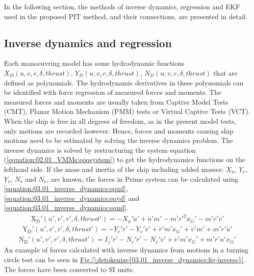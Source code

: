 \documentclass[review]{elsarticle}
\begin{document}
\sphinxAtStartPar
In the following section, the methods of inverse dynamics, regression and EKF used in the proposed PIT
method, and their connections, are presented in detail.


\subsection{Inverse dynamics and regression}
\label{\detokenize{03.01_inverse_dynamics:inverse-dynamics-and-regression}}\label{\detokenize{03.01_inverse_dynamics::doc}}
\sphinxAtStartPar
Each manoeuvring model has some hydrodynamic functions \(X_D(u,v,r,\delta,thrust)\), \(Y_D(u,v,r,\delta,thrust)\), \(N_D(u,v,r,\delta,thrust)\) that are defined as polynomials. The hydrodynamic derivatives in these polynomials can be identified with force regression of measured forces and moments. The measured forces and moments are usually taken from Captive Model Tests (CMT), Planar Motion Mechanism (PMM) tests or Virtual Captive Tests (VCT). When the ship is free in all degrees of freedom, as in the present model tests, only
motions are recorded however. Hence, forces and moments causing ship motions need to be estimated by
solving the inverse dynamics problem.
The inverse dynamics is solved by restructuring the system equation (\autoref{equation:02.01_VMMs:eqqsystem}) to get the hydrodynamics functions on the left\sphinxhyphen{}hand side. If the mass and inertia of the ship including added masses: \(X_{\dot{u}}\), \(Y_{\dot{v}}\), \(Y_{\dot{r}}\), \(N_{\dot{v}}\) and \(N_{\dot{r}}\), are known, the forces in Prime system can be calculated using \autoref{equation:03.01_inverse_dynamics:eqxd}, \autoref{equation:03.01_inverse_dynamics:eqyd} and \autoref{equation:03.01_inverse_dynamics:eqnd}.
\begin{equation}\label{equation:03.01_inverse_dynamics:eqxd}
\begin{split}\displaystyle \operatorname{X_{D}'}{\left(u',v',r',\delta,thrust' \right)} = - X_{\dot{u}}' \dot{u}' + \dot{u}' m' - m' r'^{2} x_{G}' - m' r' v'\end{split}
\end{equation}\begin{equation}\label{equation:03.01_inverse_dynamics:eqyd}
\begin{split}\displaystyle \operatorname{Y_{D}'}{\left(u',v',r',\delta,thrust' \right)} = - Y_{\dot{r}}' \dot{r}' - Y_{\dot{v}}' \dot{v}' + \dot{r}' m' x_{G}' + \dot{v}' m' + m' r' u'\end{split}
\end{equation}\begin{equation}\label{equation:03.01_inverse_dynamics:eqnd}
\begin{split}\displaystyle \operatorname{N_{D}'}{\left(u',v',r',\delta,thrust' \right)} = I_{z}' \dot{r}' - N_{\dot{r}}' \dot{r}' - N_{\dot{v}}' \dot{v}' + \dot{v}' m' x_{G}' + m' r' u' x_{G}'\end{split}
\end{equation}
\sphinxAtStartPar
An example of forces calculated with inverse dynamics from motions in a turning circle test can be seen in \hyperref[\detokenize{03.01_inverse_dynamics:fig-inverse}]{Fig.\@ \ref{\detokenize{03.01_inverse_dynamics:fig-inverse}}}. The forces have been converted to SI units.
\end{document}
